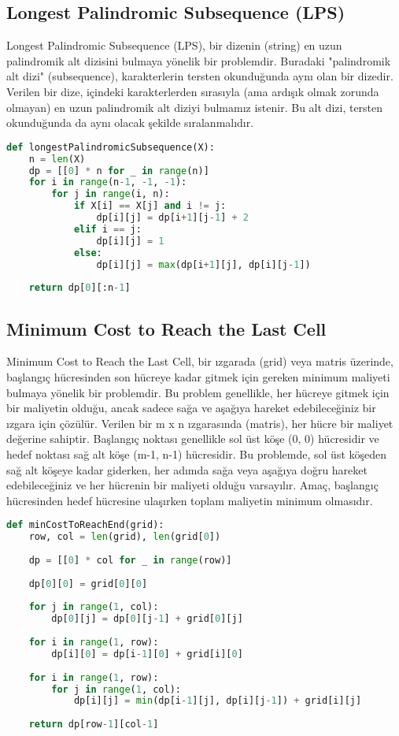 \newpage

\subsection{Longest Palindromic Subsequence (LPS)}

Longest Palindromic Subsequence (LPS), bir dizenin (string) en uzun palindromik alt dizisini bulmaya yönelik bir problemdir. Buradaki "palindromik alt dizi" (subsequence), karakterlerin tersten okunduğunda aynı olan bir dizedir. Verilen bir dize, içindeki karakterlerden sırasıyla (ama ardışık olmak zorunda olmayan) en uzun palindromik alt diziyi bulmamız istenir. Bu alt dizi, tersten okunduğunda da aynı olacak şekilde sıralanmalıdır.

\begin{lstlisting}[language=Python]
def longestPalindromicSubsequence(X):
    n = len(X)
    dp = [[0] * n for _ in range(n)]
    for i in range(n-1, -1, -1):
        for j in range(i, n):
            if X[i] == X[j] and i != j:
                dp[i][j] = dp[i+1][j-1] + 2
            elif i == j:
                dp[i][j] = 1
            else:
                dp[i][j] = max(dp[i+1][j], dp[i][j-1])
    
    return dp[0][:n-1]
\end{lstlisting}

\newpage

\subsection{Minimum Cost to Reach the Last Cell}

Minimum Cost to Reach the Last Cell, bir ızgarada (grid) veya matris üzerinde, başlangıç hücresinden son hücreye kadar gitmek için gereken minimum maliyeti bulmaya yönelik bir problemdir. Bu problem genellikle, her hücreye gitmek için bir maliyetin olduğu, ancak sadece sağa ve aşağıya hareket edebileceğiniz bir ızgara için çözülür. Verilen bir m x n ızgarasında (matris), her hücre bir maliyet değerine sahiptir. Başlangıç noktası genellikle sol üst köşe (0, 0) hücresidir ve hedef noktası sağ alt köşe (m-1, n-1) hücresidir. Bu problemde, sol üst köşeden sağ alt köşeye kadar giderken, her adımda sağa veya aşağıya doğru hareket edebileceğiniz ve her hücrenin bir maliyeti olduğu varsayılır. Amaç, başlangıç hücresinden hedef hücresine ulaşırken toplam maliyetin minimum olmasıdır.

\begin{lstlisting}[language=Python]
def minCostToReachEnd(grid):
    row, col = len(grid), len(grid[0])
    
    dp = [[0] * col for _ in range(row)]
    
    dp[0][0] = grid[0][0]
    
    for j in range(1, col):
        dp[0][j] = dp[0][j-1] + grid[0][j]
    
    for i in range(1, row):
        dp[i][0] = dp[i-1][0] + grid[i][0]
    
    for i in range(1, row):
        for j in range(1, col):
            dp[i][j] = min(dp[i-1][j], dp[i][j-1]) + grid[i][j]
    
    return dp[row-1][col-1]
\end{lstlisting}

\newpage